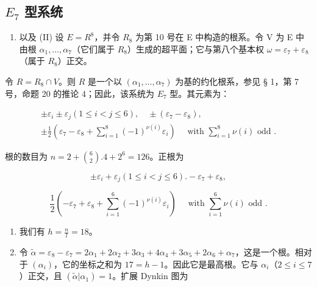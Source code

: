 \subsection{\texorpdfstring{\(E_{7}\) 型系统}{E\_7 型系统}}

\begin{enumerate}
\def\labelenumi{(\Roman{enumi})}
\tightlist
\item
  以及 (II) 设 \(E = R^{8}\)，并令 \(R_{8}\) 为第 10 号在 E 中构造的根系。令 V 为 E 中由根 \(\alpha_{1}, \ldots, \alpha_{7}\)（它们属于 \(R_{8}\)）生成的超平面；它与第八个基本权 \(\omega = \varepsilon_{7} + \varepsilon_{8}\)（属于 \(R_{8}\)）正交。
\end{enumerate}

  令 \(R = R_{8} \cap V\)。则 \(R\) 是一个以 \((\alpha_{1}, \ldots, \alpha_{7})\) 为基的约化根系，参见 § 1，第 7 号，命题 20 的推论 4；因此，该系统为 \(E_{7}\) 型。其元素为：

\[
\begin{array}{c} \pm \varepsilon_ {i} \pm \varepsilon_ {j} (1 \leqslant i < j \leqslant 6), \quad \pm (\varepsilon_ {7} - \varepsilon_ {8}), \\ \pm \frac {1}{2} (\varepsilon_ {7} - \varepsilon_ {8} + \sum_ {i = 1} ^ {8} (- 1) ^ {\nu (i)} \varepsilon_ {i}) \quad \text { with } \sum_ {i = 1} ^ {8} \nu (i) \text { odd }. \end{array}
\]

根的数目为 \(n = 2 + \binom{6}{2}.4 + 2^6 = 126\)。正根为

\[
\pm \varepsilon_ {i} + \varepsilon_ {j} (1 \leqslant i <   j \leqslant 6). - \varepsilon_ {7} + \varepsilon_ {8},
\]

\[
\frac {1}{2} \left(- \varepsilon_ {7} + \varepsilon_ {8} + \sum_ {i = 1} ^ {6} (- 1) ^ {\nu (i)} \varepsilon_ {i}\right) \quad \text { with } \sum_ {i = 1} ^ {6} \nu (i) \text { odd }.
\]

\begin{enumerate}
\def\labelenumi{(\Roman{enumi})}
\setcounter{enumi}{2}
\item
  我们有 \(h = \frac{n}{l} = 18\)。
\item
  令 \(\tilde{\alpha} = \varepsilon_8 - \varepsilon_7 = 2\alpha_1 + 2\alpha_2 + 3\alpha_3 + 4\alpha_4 + 3\alpha_5 + 2\alpha_6 + \alpha_7\)，这是一个根。相对于 \((\alpha_i)\)，它的坐标之和为 \(17 = h - 1\)。因此它是最高根。它与 \(\alpha_i\)（\(2 \leqslant i \leqslant 7\)）正交，且 \((\tilde{\alpha}|\alpha_1) = 1\)。扩展 Dynkin 图为
\end{enumerate}

